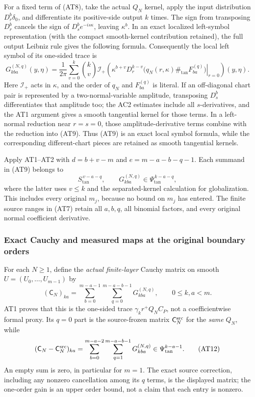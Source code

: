 \documentclass[
  11pt,
]{article}
\begin{document}
For a fixed term of (AT8), take the actual \(Q_N\) kernel, apply the
input distribution \(D_r^b\delta_0\), and differentiate its
positive-side output \(k\) times. The sign from transposing \(D_r^b\)
cancels the sign of \(D_s^b e^{-is\kappa}\), leaving \(\kappa^b\). In an
exact localized left-symbol representation (with the compact
smooth-kernel contribution retained), the full output Leibniz rule gives
the following formula. Consequently the local left symbol of its
one-sided trace is \[
 G^{(N,q)}_{kba}(y,\eta)
 =\frac1{2\pi}\sum_{v=0}^{k}\binom{k}{v}
   \mathcal I_+\!\left(
     \left.\kappa^{b+v}D_r^{k-v}
       \bigl(q_N(r,\kappa)\#_{\mathrm{tan}}F_{ba}^{(q)}\bigr)
     \right|_{r=0}
   \right)(y,\eta).
 \tag{AT9}
\] Here \(\mathcal I_+\) acts in \(\kappa\), and the order of \(q_N\)
and \(F_{ba}^{(q)}\) is literal. If an off-diagonal chart pair is
represented by a two-normal-variable amplitude, transposing \(D_s^b\)
differentiates that amplitude too; the AC2 estimates include all
\(s\)-derivatives, and the AT1 argument gives a smooth tangential kernel
for those terms. In a left-normal reduction near \(r=s=0\), those
amplitude-derivative terms combine with the reduction into (AT9). Thus
(AT9) is an exact local symbol formula, while the corresponding
different-chart pieces are retained as smooth tangential kernels.

Apply AT1--AT2 with \(d=b+v-m\) and \(e=m-a-b-q-1\). Each summand in
(AT9) belongs to \[
 S_{\mathrm{tan}}^{\,v-a-q},\qquad
 G^{(N,q)}_{kba}\in\Psi_{\mathrm{tan}}^{\,k-a-q},
 \tag{AT10}
\] where the latter uses \(v\leq k\) and the separated-kernel
calculation for globalization. This includes every original \(m_j\),
because no bound on \(m_j\) has entered. The finite source ranges in
(AT7) retain all \(a,b,q\), all binomial factors, and every original
normal coefficient derivative.

\subsubsection{Exact Cauchy and measured maps at the original boundary
orders}\label{exact-cauchy-and-measured-maps-at-the-original-boundary-orders}

For each \(N\geq1\), define the \emph{actual finite-layer} Cauchy matrix
on smooth \(U=(U_0,\ldots,U_{m-1})\) by \[
 (\mathsf C_N)_{ka}
   =\sum_{b=0}^{m-a-1}\sum_{q=0}^{m-a-b-1}
          G^{(N,q)}_{kba},
 \qquad 0\leq k,a<m .
 \tag{AT11}
\] AT1 proves that this is the one-sided trace \(\gamma_k r^+Q_NC_P\),
not a coefficientwise formal proxy. Its \(q=0\) part is the
source-frozen matrix \(\mathsf C_N^{\rm src}\) for the \emph{same}
\(Q_N\), while \[
 (\mathsf C_N-\mathsf C_N^{\rm src})_{ka}
 =\sum_{b=0}^{m-a-2}\sum_{q=1}^{m-a-b-1}G^{(N,q)}_{kba}
 \in\Psi_{\mathrm{tan}}^{k-a-1}.
 \tag{AT12}
\] An empty sum is zero, in particular for \(m=1\). The exact source
correction, including any nonzero cancellation among its \(q\) terms, is
the displayed matrix; the one-order gain is an upper order bound, not a
claim that each entry is nonzero.
\end{document}
